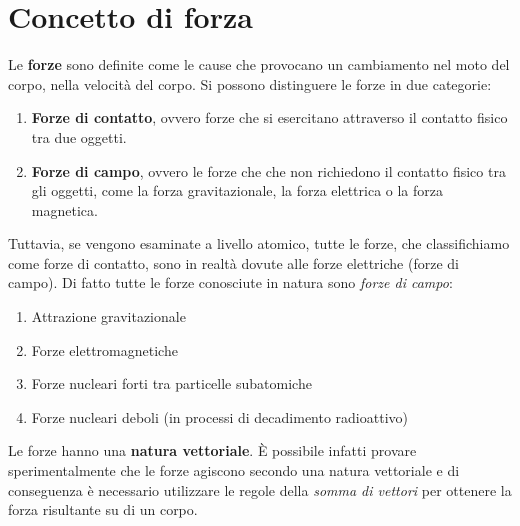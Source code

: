 \documentclass[12pt,oneside]{book}
\begin{document}
\section{Concetto di forza}
Le \textbf{forze} sono definite come le cause che provocano un cambiamento nel moto del corpo, nella velocità del corpo.
Si possono distinguere le forze in due categorie:
\begin{enumerate}
    \item \textbf{Forze di contatto}, ovvero forze che si esercitano attraverso il contatto fisico tra due oggetti.
    \item \textbf{Forze di campo}, ovvero le forze che che non richiedono il contatto fisico tra gli oggetti, come la forza gravitazionale, la forza elettrica o la forza magnetica.
\end{enumerate}
Tuttavia, se vengono esaminate a livello atomico, tutte le forze, che classifichiamo come forze di contatto, sono in realtà dovute
alle forze elettriche (forze di campo). Di fatto tutte le forze conosciute in natura sono \emph{forze di campo}:
\begin{enumerate}
    \item Attrazione gravitazionale
    \item Forze elettromagnetiche
    \item Forze nucleari forti tra particelle subatomiche
    \item Forze nucleari deboli (in processi di decadimento radioattivo)
\end{enumerate}

\noindent Le forze hanno una \textbf{natura vettoriale}. È possibile infatti provare sperimentalmente che le forze agiscono secondo una
natura vettoriale e di conseguenza è necessario utilizzare le regole della \emph{somma di vettori} per ottenere la forza risultante su di un corpo.
\end{document}
